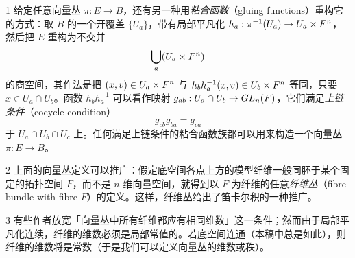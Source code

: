 
\begin{rem}{1}
给定任意向量丛 $\pi: E\to B$，还有另一种用\emph{粘合函数}（gluing functions）重构它的方式：取 $B$ 的一个开覆盖 $\{U_a\}$，带有局部平凡化 $h_a: \pi^{-1}(U_a)\to U_a\times F^n$，然后把 $E$ 重构为不交并
\[ \bigcup_a (U_a\times F^n) \]
的商空间，其作法是把 $(x,v)\in U_a\times F^n$ 与 $h_bh_a^{-1}(x,v)\in U_b\times F^n$ 等同，只要 $x\in U_a\cap U_b$。函数 $h_bh_a^{-1}$ 可以看作映射 $g_{ab}: U_a\cap U_b\to GL_n(F)$，它们满足\emph{上链条件}（cocycle condition）
\[ g_{cb}g_{ba}=g_{ca} \]
于 $U_a\cap U_b\cap U_c$ 上。任何满足上链条件的粘合函数族都可以用来构造一个向量丛 $\pi: E\to B$。
\end{rem}


\begin{rem}{2}
上面的向量丛定义可以推广：假定底空间各点上方的模型纤维一般同胚于某个固定的拓扑空间 $F$，而不是 $n$ 维向量空间，就得到以 $F$ 为纤维的任意\emph{纤维丛}（fibre bundle with fibre $F$）的定义。这样，纤维丛给出了笛卡尔积的一种推广。
\end{rem}

\begin{rem}{3}
有些作者放宽「向量丛中所有纤维都应有相同维数」这一条件；然而由于局部平凡化连续，纤维的维数必须是局部常值的。若底空间连通（本稿中总是如此），则纤维的维数将是常数（于是我们可以定义向量丛的维数或秩）。
\end{rem}



